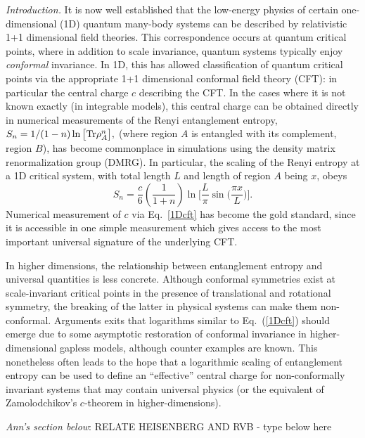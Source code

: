 \documentclass[prl,aps,twocolumn,floatfix,amsmath,amssymb,superscriptaddress,tightenlines]{revtex4}
\begin{document}
{\it Introduction.} It is now well established that the low-energy physics of certain one-dimensional (1D) quantum many-body systems can be described by relativistic 1+1 dimensional field theories.  This correspondence occurs at quantum critical points, where in addition to scale invariance, quantum systems typically enjoy {\it conformal} invariance.  In 1D, this has allowed classification of quantum critical points via the appropriate 1+1 dimensional conformal field theory (CFT): in particular the central charge $c$ describing the CFT.
In the cases where it is not known exactly (in integrable models), 
this central charge can be obtained directly in numerical measurements of the Renyi entanglement entropy,
$
S_n = 1/(1-n) \ln \big[ {\rm Tr} \rho_A^n \big],
$
(where region $A$ is entangled with its complement, region $B$), has become commonplace in simulations using the density matrix renormalization group (DMRG).  In particular, the
scaling of the Renyi entropy at a 1D critical system, with total length $L$ and length of region $A$ being $x$, obeys
\begin{equation}
S_n = \frac{c}{6}\left({ \frac{1}{1+n} }\right) \ln\Big[ \frac{L}{\pi} \sin\big( \frac{\pi x}{L} \big) \Big]. \label{1Dcft}
\end{equation}
Numerical measurement of $c$ via Eq.~\ref{1Dcft} has become the gold standard, since it is accessible in one simple measurement which gives access to the most important universal signature of the underlying CFT.

In higher dimensions, the relationship between entanglement entropy and universal quantities is less concrete.  Although conformal symmetries exist at scale-invariant critical points in the presence of translational and rotational symmetry, the breaking of the latter in physical systems can make them non-conformal.  Arguments exits that logarithms similar to Eq.~(\ref{1Dcft}) should emerge due to some asymptotic restoration of conformal invariance in higher-dimensional gapless models, although counter examples are known.  This nonetheless often leads to the hope that a logarithmic scaling of entanglement entropy can be used to define an ``effective'' central charge for non-conformally invariant systems that may contain universal physics (or the equivalent of Zamolodchikov's $c$-theorem in higher-dimensions).

{\it \color{red} Ann's section below}:
{\color{red} RELATE HEISENBERG AND RVB - type below here}
\end{document}
